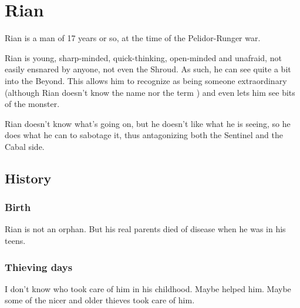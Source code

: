 \section{Rian}
Rian is a \human{} man of 17 years or so, at the time of the Pelidor-Runger war. 

Rian is young, sharp-minded, quick-thinking, open-minded and unafraid, not easily ensnared by anyone, not even the Shroud. As such, he can see quite a bit into the Beyond. This allows him to recognize \Ishna{} as being someone extraordinary (although Rian doesn't know the name \quo{\Ishna} nor the term \quo{\vertex}) and even lets him see bits of the  monster. 

Rian doesn't know what's going on, but he doesn't like what he is seeing, so he does what he can to sabotage it, thus antagonizing both the Sentinel and the Cabal side. 









\subsection{History}
\subsubsection{Birth}
Rian is not an orphan. 
But his real parents died of disease when he was in his teens. 







\subsubsection{Thieving days}
I don't know who took care of him in his childhood. 
Maybe  helped him. 
Maybe some of the nicer and older thieves took care of him. 

